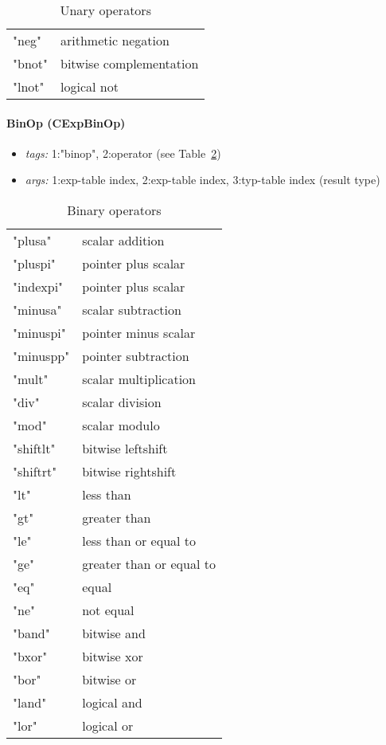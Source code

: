 \documentclass[11pt]{article}
\begin{document}
\begin{table}[t]
\centering
\begin{tabular}{l|l} \hline
"neg" & arithmetic negation \\
"bnot" & bitwise complementation \\
"lnot" & logical not  \\ \hline
\end{tabular}
\caption{\label{tab:unop}Unary operators}
\end{table}


\paragraph{BinOp (CExpBinOp)}
\begin{itemize}
\item \emph{tags:} 1:"binop", 2:operator (see Table~\ref{tab:binop})
\item \emph{args:} 1:exp-table index, 2:exp-table index, 3:typ-table index (result type)
\end{itemize}

\begin{table}[t]
\centering
\begin{tabular}{l|l} \hline
"plusa" & scalar addition \\
"pluspi" & pointer plus scalar \\
"indexpi" & pointer plus scalar\\
"minusa" & scalar subtraction \\
"minuspi" & pointer minus scalar \\
"minuspp" & pointer subtraction \\
"mult" & scalar multiplication \\
"div" & scalar division \\
"mod" & scalar modulo \\
"shiftlt" & bitwise leftshift \\
"shiftrt" & bitwise rightshift \\
"lt" & less than \\
"gt" & greater than \\
"le" & less than or equal to \\
"ge" & greater than or equal to \\
"eq" & equal \\
"ne" & not equal \\
"band" & bitwise and \\
"bxor" & bitwise xor \\
"bor" & bitwise or \\
"land" & logical and \\
"lor" & logical or
\end{tabular}
\caption{\label{tab:binop}Binary operators}
\end{table}
\end{document}
